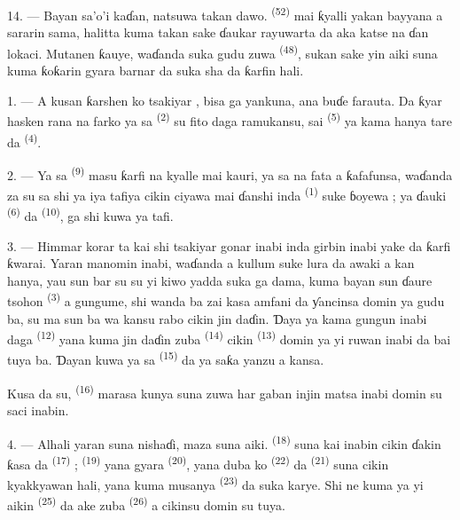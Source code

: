 14. --- Bayan sa’o’i kaɗan, natsuwa takan dawo. 
\textsuperscript{(52)} mai ƙyalli yakan bayyana a sararin sama, halitta
kuma takan sake ɗaukar rayuwarta da aka katse na ɗan lokaci. Mutanen
ƙauye, waɗanda suka gudu zuwa  \textsuperscript{(48)},
sukan sake yin aiki suna kuma ƙoƙarin gyara barnar da suka sha da
ƙarfin hali.

\VUsaut{6.0mm}
\VUsaut{3.6mm}

\VUsaut{1.4mm}
\VUsaut{4.0mm}

1. --- A kusan ƙarshen  ko tsakiyar ,
bisa ga yankuna, ana buɗe farauta. Da ƙyar hasken rana na farko ya sa
 \textsuperscript{(2)} su fito daga ramukansu, sai
 \textsuperscript{(5)} ya kama hanya tare da
 \textsuperscript{(4)}.

2. --- Ya sa  \textsuperscript{(9)} masu ƙarfi
na kyalle mai kauri, ya sa  na fata a ƙafafunsa,
waɗanda za su sa shi ya iya tafiya cikin ciyawa mai ɗanshi inda
 \textsuperscript{(1)} suke ɓoyewa ; ya ɗauki
 \textsuperscript{(6)} da 
\textsuperscript{(10)}, ga shi kuwa ya tafi.

3. --- Himmar korar ta kai shi tsakiyar gonar inabi inda girbin inabi
yake da ƙarfi ƙwarai. Yaran manomin inabi, waɗanda a kullum suke lura
da awaki a kan hanya, yau sun bar su su yi kiwo yadda suka ga dama,
kuma bayan sun ɗaure tsohon  \textsuperscript{(3)} a
gungume, shi wanda ba zai kasa amfani da ƴancinsa domin ya gudu ba, su
ma sun ba wa kansu rabo cikin jin daɗin. Ɗaya ya kama gungun inabi
daga  \textsuperscript{(12)} yana kuma jin daɗin
zuba  \textsuperscript{(14)} cikin 
\textsuperscript{(13)} domin ya yi ruwan inabi da bai tuya ba. Ɗayan
kuwa ya sa  \textsuperscript{(15)} da ya saƙa yanzu
a kansa.

Kusa da su,  \textsuperscript{(16)} marasa kunya
suna zuwa har gaban injin matsa inabi domin su saci inabin.

4. --- Alhali yaran suna nishaɗi, maza suna aiki.  \textsuperscript{(18)} suna kai inabin cikin ɗakin ƙasa da
 \textsuperscript{(17)} ;  \textsuperscript{(19)} yana gyara 
\textsuperscript{(20)}, yana duba ko 
\textsuperscript{(22)} da  \textsuperscript{(21)} suna
cikin kyakkyawan hali, yana kuma musanya 
\textsuperscript{(23)} da suka karye. Shi ne kuma ya yi aikin
 \textsuperscript{(25)} da ake zuba 
\textsuperscript{(26)} a cikinsu domin su tuya.

